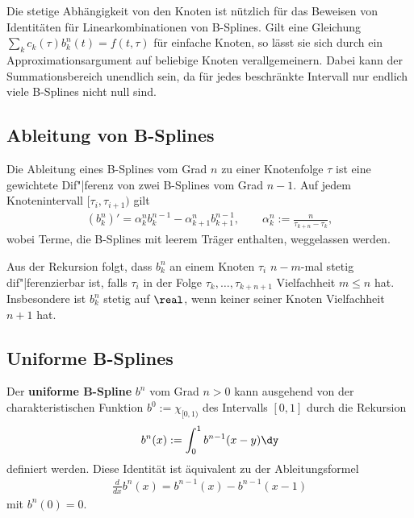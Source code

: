 \linie

Die stetige Abhängigkeit von den Knoten ist nützlich für das Beweisen von
Identitäten für Linearkombinationen von B-Splines.
Gilt eine Gleichung $\sum_k c_k(\tau) b_k^n(t) = f(t, \tau)$
für einfache Knoten, so lässt sie sich durch ein Approximationsargument auf
beliebige Knoten verallgemeinern.
Dabei kann der Summationsbereich unendlich sein, da für jedes beschränkte
Intervall nur endlich viele B-Splines nicht null sind.

\pagebreak

\subsection{%
    Ableitung von B-Splines%
}

Die Ableitung eines B-Splines vom Grad $n$ zu einer Knotenfolge $\tau$ ist
eine gewichtete Dif"|ferenz von zwei B-Splines vom Grad $n - 1$.
Auf jedem Knotenintervall $[\tau_i, \tau_{i+1})$ gilt
\begin{align*}
    (b_k^n)' = \alpha_k^n b_k^{n-1} - \alpha_{k+1}^n b_{k+1}^{n-1}, \qquad
    \alpha_k^n := \frac{n}{\tau_{k+n} - \tau_k},
\end{align*}
wobei Terme, die B-Splines mit leerem Träger enthalten, weggelassen werden.

Aus der Rekursion folgt, dass $b_k^n$ an einem Knoten $\tau_i$ $n - m$-mal
stetig dif"|ferenzierbar ist, falls $\tau_i$ in der Folge
$\tau_k, \dotsc, \tau_{k+n+1}$ Vielfachheit $m \le n$ hat.
Insbesondere ist $b_k^n$ stetig auf $\real$, wenn keiner seiner Knoten
Vielfachheit $n + 1$ hat.

\subsection{%
    Uniforme B-Splines%
}

Der \textbf{uniforme B-Spline} $b^n$ vom Grad $n > 0$ kann ausgehend von der
charakteristischen Funktion $b^0 := \chi_{[0,1)}$ des Intervalls $[0, 1]$
durch die Rekursion
\begin{align*}
    b^n(x) := \int_0^1 b^{n-1} (x - y) \dy
\end{align*}
definiert werden.
Diese Identität ist äquivalent zu der Ableitungsformel
\begin{align*}
    \frac{d}{dx} b^n(x) = b^{n-1}(x) - b^{n-1}(x - 1)
\end{align*}
mit $b^n(0) = 0$.

\linie

